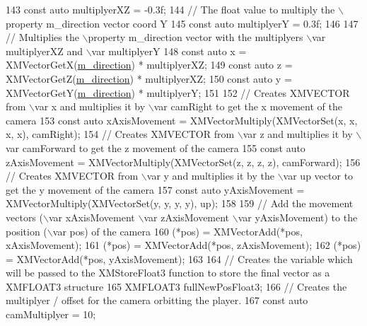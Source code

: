 \begin{DoxyCode}
143     \textcolor{keyword}{const} \textcolor{keyword}{auto} multiplyerXZ = -0.3f;
144     \textcolor{comment}{// The float value to multiply the \(\backslash\)property m\_direction vector coord Y}
145     \textcolor{keyword}{const} \textcolor{keyword}{auto} multiplyerY = 0.3f;
146 
147     \textcolor{comment}{// Multiplies the \(\backslash\)property m\_direction vector with the multiplyers \(\backslash\)var multiplyerXZ and \(\backslash\)var
       multiplyerY}
148     \textcolor{keyword}{const} \textcolor{keyword}{auto} x = XMVectorGetX(\mbox{\hyperlink{class_camera_helper_af2822e6b05e48f33100c2f678e3776ce}{m\_direction}}) * multiplyerXZ;
149     \textcolor{keyword}{const} \textcolor{keyword}{auto} z = XMVectorGetZ(\mbox{\hyperlink{class_camera_helper_af2822e6b05e48f33100c2f678e3776ce}{m\_direction}}) * multiplyerXZ;
150     \textcolor{keyword}{const} \textcolor{keyword}{auto} y = XMVectorGetY(\mbox{\hyperlink{class_camera_helper_af2822e6b05e48f33100c2f678e3776ce}{m\_direction}}) * multiplyerY;
151 
152     \textcolor{comment}{// Creates XMVECTOR from \(\backslash\)var x and multiplies it by \(\backslash\)var camRight to get the x movement of the camera}
153     \textcolor{keyword}{const} \textcolor{keyword}{auto} xAxisMovement = XMVectorMultiply(XMVectorSet(x, x, x, x), camRight);
154     \textcolor{comment}{// Creates XMVECTOR from \(\backslash\)var z and multiplies it by \(\backslash\)var camForward to get the z movement of the
       camera}
155     \textcolor{keyword}{const} \textcolor{keyword}{auto} zAxisMovement = XMVectorMultiply(XMVectorSet(z, z, z, z), camForward);
156     \textcolor{comment}{// Creates XMVECTOR from \(\backslash\)var y and multiplies it by the \(\backslash\)var up vector to get the y movement of the
       camera}
157     \textcolor{keyword}{const} \textcolor{keyword}{auto} yAxisMovement = XMVectorMultiply(XMVectorSet(y, y, y, y), up);
158     
159     \textcolor{comment}{// Add the movement vectors (\(\backslash\)var xAxisMovement \(\backslash\)var zAxisMovement \(\backslash\)var yAxisMovement) to the position
       (\(\backslash\)var pos) of the camera}
160     (*pos) = XMVectorAdd(*pos, xAxisMovement);
161     (*pos) = XMVectorAdd(*pos, zAxisMovement);
162     (*pos) = XMVectorAdd(*pos, yAxisMovement);
163 
164     \textcolor{comment}{// Creates the variable which will be passed to the XMStoreFloat3 function to store the final vector as
       a XMFLOAT3 structure}
165     XMFLOAT3 fullNewPosFloat3;
166     \textcolor{comment}{// Creates the multiplyer / offset for the camera orbitting the player.}
167     \textcolor{keyword}{const} \textcolor{keyword}{auto} camMultiplyer = 10;

\end{DoxyCode}

